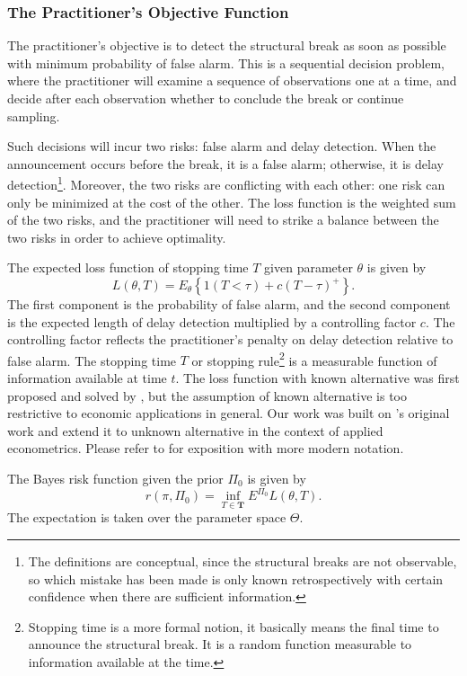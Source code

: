 \documentclass[preprint,authoryear,12pt,english]{elsarticle}
\theoremstyle{plain}
\begin{document}
\subsubsection{The Practitioner's Objective Function}
The practitioner's objective is to detect the structural break as soon as possible with minimum probability of false alarm. This is a sequential decision problem, where the practitioner will examine a sequence of observations one at a time, and decide after each observation whether to conclude the break or continue sampling.

Such decisions will incur two risks: false alarm and delay detection. When the announcement occurs before the break, it is a false alarm; otherwise, it is delay detection\footnote{The definitions are conceptual, since the structural breaks are not observable, so which mistake has been made is only known retrospectively with certain confidence when there are sufficient information.}. Moreover, the two risks are conflicting with each other: one risk can only be minimized at the cost of the other. The loss function is the weighted sum of the two risks, and the practitioner will need to strike a balance between the two risks in order to achieve optimality.

The expected loss function of stopping time $T$ given parameter $\theta$ is given by
\begin{equation}
    L(\theta,T) = E_{\theta}\left\{ 1(T<\tau) +c(T-\tau)^{+}\right\}.
\end{equation}
The first component is the probability of false alarm, and the second component is the expected length of delay detection multiplied by a controlling factor $c$. The controlling factor reflects the practitioner's penalty on delay detection relative to false alarm. The stopping time $T$ or stopping rule\footnote{Stopping time is a more formal notion, it basically means the final time to announce the structural break. It is a random function measurable to information available at the time.} is a measurable function of information available at time $t$. The loss function with known alternative was first proposed and solved by \cite{Shiryaev1963}, but the assumption of known alternative is too restrictive to economic applications in general. Our work was built on \cite{Shiryaev1963, Shiryaev1978OptimalRules}'s original work and extend it to unknown alternative in the context of applied econometrics. Please refer to \cite{Poor2009QuickestDetection} for exposition with more modern notation.

The Bayes risk function given the prior $\Pi_{0}$ is given by
\begin{equation}
    r(\pi,\Pi_{0}) = \inf_{T \in \mathbf{T}} E^{\Pi_{0}}L(\theta,T).\label{eq:Bayes Risk}
\end{equation}
The expectation is taken over the parameter space $\Theta$.
\end{document}
